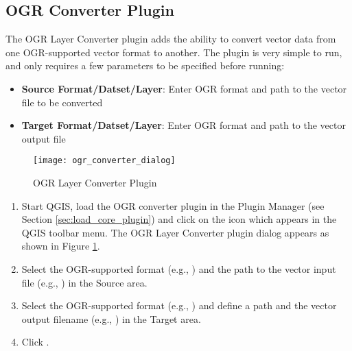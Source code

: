 
\subsection{OGR Converter Plugin}


The OGR Layer Converter plugin adds the ability to convert vector data from one OGR-supported 
vector format to another.
The plugin is very simple to run, and only requires a few parameters to be 
specified before running:

\begin{itemize}
\item \textbf{Source Format/Datset/Layer}: Enter OGR format and path to the vector file to be converted
\item \textbf{Target Format/Datset/Layer}: Enter OGR format and path to the vector output file
\end{itemize}

\begin{figure}[ht]
   \begin{center}
   \caption{OGR Layer Converter Plugin \nixcaption}\label{fig:ogr_converter_dialog}\smallskip
   \texttt{[image: ogr\_converter\_dialog]}
\end{center}  
\end{figure}


\begin{enumerate}
  \item Start QGIS, load the OGR converter plugin in the Plugin Manager (see Section 
  \ref{sec:load_core_plugin}) and click on the  
  icon which appears in the QGIS toolbar menu. The OGR Layer Converter plugin dialog appears as shown in Figure \ref{fig:ogr_converter_dialog}.
  \item Select the OGR-supported format (e.g., ) and the path to the vector input file (e.g., ) in the Source area.
  \item Select the OGR-supported format (e.g., ) and define a path and the vector output filename (e.g., ) in the Target area.
  \item Click .
\end{enumerate}

\newpage
